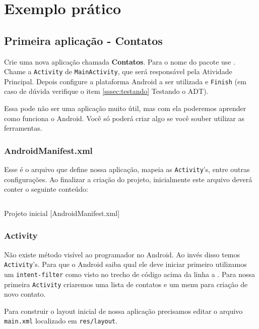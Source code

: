 \chapter{Exemplo prático}

\section{Primeira aplicação - Contatos}

Crie uma nova aplicação chamada \textbf{Contatos}. Para o nome do pacote use .
Chame a \texttt{Activity} de \texttt{MainActivity}, que será responsável pela Atividade Principal. Depois
configure a plataforma Android a ser utilizada e \texttt{Finish} (em caso de dúvida verifique o item
\ref{sssec:testando} Testando o ADT).

Essa pode não ser uma aplicação muito útil, mas com ela poderemos aprender como funciona o Android. Você
só poderá criar algo se você souber utilizar as ferramentas.

\subsection{AndroidManifest.xml}

Esse é o arquivo que define nossa aplicação, mapeia as \texttt{Activity}'s, entre outras configurações. Ao finalizar
a criação do projeto, inicialmente este arquivo deverá conter o seguinte conteúdo:

\begin{listing}[H]
  \inputminted[linenos=true,frame=bottomline,tabsize=3]{ xml }{ source/AndroidManifest-1.xml }
  \caption{Projeto inicial [AndroidManifest.xml]}
\end{listing}

\subsection{Activity}

Não existe método  visível ao programador no Android. Ao invés disso temos \texttt{Activity}'s.
Para que o Android saiba qual ele deve iniciar primeiro utilizamos um \texttt{intent-filter} como visto
no trecho de código acima da linha  a .
Para nossa primeira \texttt{Activity} criaremos uma lista de contatos e um menu para criação de novo contato.

Para construir o layout inicial de nossa aplicação precisamos editar o arquivo \texttt{main.xml} localizado em
\texttt{res/layout}.

